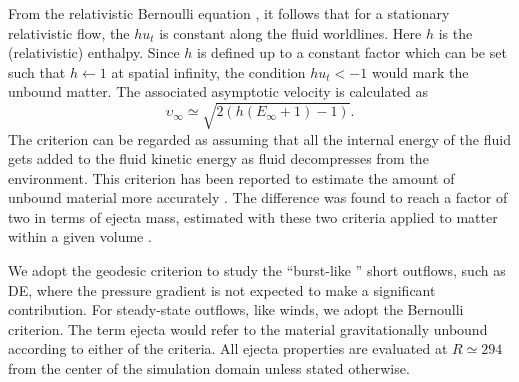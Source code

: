 From the relativistic Bernoulli equation \citep{Rezzolla:2013}, it follows
that for a stationary relativistic flow, the $hu_t$ is constant along the 
fluid worldlines. Here $h$ is the (relativistic) enthalpy. 
%
Since $h$ is defined up to a constant factor which can be set such 
that $h \leftarrow 1$ at spatial infinity, 
the condition $hu_t < -1$ would mark the unbound matter. 
%
The associated asymptotic velocity is calculated as 
%
\begin{equation}
\upsilon_{\infty} \simeq \sqrt{2 (h (E_{\infty}+1)-1)}. 
\end{equation}
%
The criterion can be regarded as assuming that all the internal energy of 
the fluid gets added to the fluid kinetic energy as fluid decompresses from 
the \pmerg{} environment. 
%
%
This criterion has been reported to estimate the amount of unbound material more accurately
\citep{Foucart:2015gaa}. 
The difference was found to reach a 
factor of two in terms of ejecta mass, estimated with these 
two criteria applied to matter within 
a given volume \citep{Kastaun:2014fna}. 



We adopt the geodesic criterion to study the ``burst-like '' short outflows,
such as \ac{DE}, where the pressure gradient is not expected to make a significant contribution.
For steady-state outflows, like \pmerg{} winds, we adopt the Bernoulli criterion.
%
The term ejecta would refer to the material gravitationally 
unbound according to either of the criteria.
%
All ejecta properties are evaluated at $R \simeq 294$ from the center of the 
simulation domain unless stated otherwise. 



